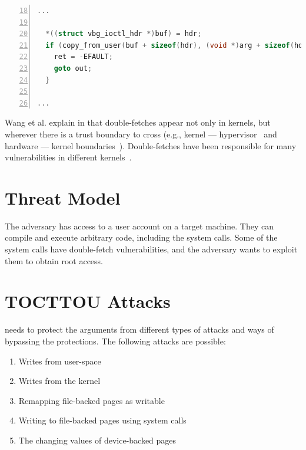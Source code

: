 \begin{lstlisting}[language=C, caption=CVE-2018-12633 Double Fetch Fix,
  label=code:cvedoublefetchfix,  breaklines=true
  postbreak=\mbox{\textcolor{red}{$\hookrightarrow$}\space},
  numbers=left,basicstyle=\scriptsize, firstnumber=18]
...

  *((struct vbg_ioctl_hdr *)buf) = hdr;
  if (copy_from_user(buf + sizeof(hdr), (void *)arg + sizeof(hdr), hdr.size_in - sizeof(hdr))) {
    ret = -EFAULT;
    goto out;
  }

...

\end{lstlisting}

Wang et al. explain in \cite{wang2018survey} that double-fetches appear not only
in kernels, but wherever there is a trust boundary to cross (e.g., kernel ---
hypervisor~\cite{wilhelm2016xenpwn} and hardware --- kernel
boundaries~\cite{lu2018untrusted}). Double-fetches have been responsible for many
vulnerabilities in different kernels~\cite{jurczyk2013bochspwn, wang2018survey}.


\section{Threat Model}
\label{sec:threatmodel}
The adversary has access to a user account on a target machine. They can compile
and execute arbitrary code, including the system calls. Some of the system calls
have double-fetch vulnerabilities, and the adversary wants to exploit them to
obtain root access.

\section{TOCTTOU Attacks}

\sysname needs to protect the arguments from different types of attacks and ways of
bypassing the protections. The following attacks are possible:

\begin{enumerate}
  \item \label{first} Writes from user-space
  \item \label{second} Writes from the kernel
  \item \label{third} Remapping file-backed pages as writable
  \item \label{fourth} Writing to file-backed pages using system calls
  \item \label{fifth} The changing values of device-backed pages
\end{enumerate}


